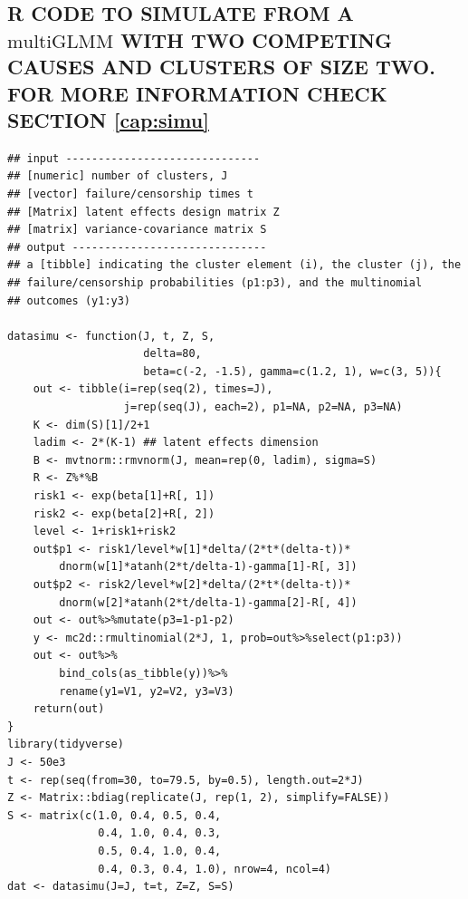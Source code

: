 \documentclass[12pt, %
               openright, %
               oneside, %
               a4paper, %
               chapter=TITLE, %
               section=TITLE, %
               brazil,
               english %
]{abntex2}
\renewcommand{\ABNTEXchapterfontsize}{\bfseries\large}
\begin{document}
\begin{apendicesenv}
\chapter{R CODE TO SIMULATE FROM A \(\text{multiGLMM}\) WITH TWO
         COMPETING CAUSES AND CLUSTERS OF SIZE TWO. FOR MORE
         INFORMATION CHECK SECTION \ref{cap:simu}}
\label{cap:appendixC}

\begin{lstlisting}
## input ------------------------------
## [numeric] number of clusters, J
## [vector] failure/censorship times t
## [Matrix] latent effects design matrix Z
## [matrix] variance-covariance matrix S
## output ------------------------------
## a [tibble] indicating the cluster element (i), the cluster (j), the
## failure/censorship probabilities (p1:p3), and the multinomial
## outcomes (y1:y3)

datasimu <- function(J, t, Z, S,
                     delta=80,
                     beta=c(-2, -1.5), gamma=c(1.2, 1), w=c(3, 5)){
    out <- tibble(i=rep(seq(2), times=J),
                  j=rep(seq(J), each=2), p1=NA, p2=NA, p3=NA)
    K <- dim(S)[1]/2+1
    ladim <- 2*(K-1) ## latent effects dimension
    B <- mvtnorm::rmvnorm(J, mean=rep(0, ladim), sigma=S)
    R <- Z%*%B
    risk1 <- exp(beta[1]+R[, 1])
    risk2 <- exp(beta[2]+R[, 2])
    level <- 1+risk1+risk2
    out$p1 <- risk1/level*w[1]*delta/(2*t*(delta-t))*
        dnorm(w[1]*atanh(2*t/delta-1)-gamma[1]-R[, 3])
    out$p2 <- risk2/level*w[2]*delta/(2*t*(delta-t))*
        dnorm(w[2]*atanh(2*t/delta-1)-gamma[2]-R[, 4])
    out <- out%>%mutate(p3=1-p1-p2)
    y <- mc2d::rmultinomial(2*J, 1, prob=out%>%select(p1:p3))
    out <- out%>%
        bind_cols(as_tibble(y))%>%
        rename(y1=V1, y2=V2, y3=V3)
    return(out)
}
library(tidyverse)                     
J <- 50e3
t <- rep(seq(from=30, to=79.5, by=0.5), length.out=2*J)
Z <- Matrix::bdiag(replicate(J, rep(1, 2), simplify=FALSE))
S <- matrix(c(1.0, 0.4, 0.5, 0.4,
              0.4, 1.0, 0.4, 0.3,
              0.5, 0.4, 1.0, 0.4,
              0.4, 0.3, 0.4, 1.0), nrow=4, ncol=4)
dat <- datasimu(J=J, t=t, Z=Z, S=S)
\end{lstlisting}

\end{apendicesenv}
\printindex
\end{document}
